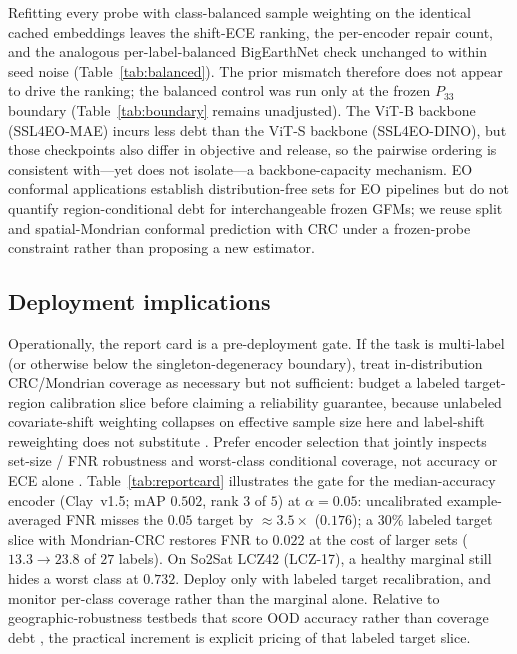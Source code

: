 \documentclass[journal]{IEEEtran}
\renewcommand{\_}{\textunderscore\allowbreak}
\begin{document}
\noindent Refitting every probe with class-balanced sample weighting on the identical cached embeddings
leaves the shift-ECE ranking, the per-encoder repair count, and the analogous per-label-balanced
BigEarthNet check unchanged to within seed noise (Table~\ref{tab:balanced}). The prior mismatch
therefore does not appear to drive the ranking; the balanced control was run only at the frozen
$P_{33}$ boundary (Table~\ref{tab:boundary} remains unadjusted). The ViT-B backbone (SSL4EO-MAE)
incurs less debt than the ViT-S backbone (SSL4EO-DINO), but those checkpoints also differ in objective
and release, so the pairwise ordering is consistent with---yet does not isolate---a backbone-capacity
mechanism. EO conformal applications establish distribution-free sets for EO pipelines
\citep{singh2024uncertainty,lou2024geoconformal,mao2024spatial} but do not quantify region-conditional
debt for interchangeable frozen GFMs; we reuse split and spatial-Mondrian conformal prediction with
CRC \citep{vovk2005algorithmic,vovk2003mondrian,angelopoulos2024crc} under a frozen-probe constraint
rather than proposing a new estimator.

\subsection{Deployment implications}\label{sec:reportcard}
Operationally, the report card is a pre-deployment gate. If the task is multi-label (or otherwise below
the singleton-degeneracy boundary), treat in-distribution CRC/Mondrian coverage as necessary but not
sufficient: budget a labeled target-region calibration slice before claiming a reliability guarantee,
because unlabeled covariate-shift weighting collapses on effective sample size here and label-shift
reweighting does not substitute \citep{tibshirani2019covariate}. Prefer encoder selection that jointly
inspects set-size / FNR robustness and worst-class conditional coverage, not accuracy or ECE alone
\citep{romano2020classification,cauchois2021knowing}. Table~\ref{tab:reportcard} illustrates the gate
for the median-accuracy encoder (Clay~v1.5; mAP $0.502$, rank $3$ of $5$) at $\alpha{=}0.05$:
uncalibrated example-averaged FNR misses the $0.05$ target by ${\approx}3.5\times$ ($0.176$); a
$30\%$ labeled target slice with Mondrian-CRC restores FNR to $0.022$ at the cost of larger sets
($13.3\to23.8$ of $27$ labels). On So2Sat LCZ42 (LCZ-17), a healthy marginal still hides a worst
class at $0.732$. Deploy only with labeled target recalibration, and monitor per-class coverage rather
than the marginal alone. Relative to geographic-robustness testbeds that score OOD accuracy rather than
coverage debt \citep{doerksen2026earthshift,alemadi2025dsgr,meyer2021aoa}, the practical increment is
explicit pricing of that labeled target slice.
\end{document}
